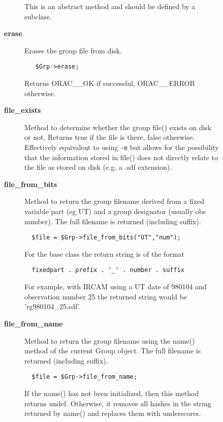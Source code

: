 \begin{description}
\begin{description}
\begin{description}
This is an abstract method and should be defined by a subclass.


\item[{\textbf{erase}}] \mbox{}

Erases the group file from disk.

\begin{verbatim}
   $Grp->erase;
\end{verbatim}


Returns ORAC\_\_OK if successful, ORAC\_\_ERROR otherwise.


\item[{\textbf{file\_exists}}] \mbox{}

Method to determine whether the group file() exists on disk or not.
Returns true if the file is there, false otherwise. Effectively
equivalent to using \texttt{-e} but allows for the possibility that the
information stored in file() does not directly relate to the
file as stored on disk (e.g. a .sdf extension).


\item[{\textbf{file\_from\_bits}}] \mbox{}

Method to return the group filename derived from a fixed
variable part (eg UT) and a group designator (usually obs
number). The full filename is returned (including suffix).

\begin{verbatim}
  $file = $Grp->file_from_bits("UT","num");
\end{verbatim}


For the base class the return string is of the format

\begin{verbatim}
  fixedpart . prefix . '_' . number . suffix
\end{verbatim}


For example, with IRCAM using a UT date of 980104 and observation
number 25 the returned string would be 'rg980104\_25.sdf'.


\item[{\textbf{file\_from\_name}}] \mbox{}

Method to return the group filename using the name() method of the
current Group object. The full filename is returned (including
suffix).

\begin{verbatim}
  $file = $Grp->file_from_name;
\end{verbatim}


If the name() has not been initialized, then this method returns
undef. Otherwise, it removes all hashes in the string returned by
name() and replaces them with underscores.




\end{description}
\end{description}
\end{description}

